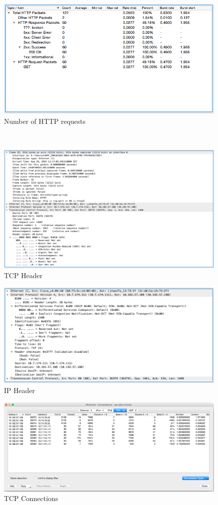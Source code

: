 \documentclass[12pt]{article}
\begin{document}
\begin{figure}[h!]
\centerline {\includegraphics[scale=0.4]{../Screenshots/num-http-requests.png}}
\caption{Number of HTTP requests}
\end{figure}
~\\
\begin{figure}[h]
\includegraphics[scale=0.38]{../Screenshots/tcp-header.png}
\caption{TCP Header}
\end{figure}
\begin{figure}[h!]
\centering
\includegraphics[scale=0.5]{../Screenshots/ip-header.png}
\caption{IP Header}
\end{figure}
\begin{figure}[h!]
\includegraphics[scale=0.39]{../Screenshots/tcp-connections.png}
\caption{TCP Connections}
\end{figure}
\end{document}
